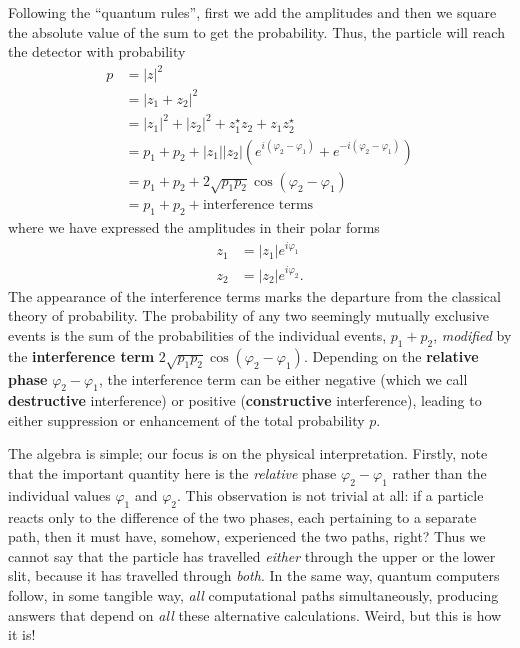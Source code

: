 \documentclass[fleqn]{article}
\begin{document}
Following the ``quantum rules'', first we add the amplitudes and then we square the absolute value of the sum to get the probability.
Thus, the particle will reach the detector with probability
\[
  \begin{aligned}
    p &= |z|^2
  \\& = |z_1 + z_2|^2
  \\& = |z_1|^2 + |z_2|^2
        + z_1^\star z_2 + z_1 z_2^\star
  \\& = p_1 + p_2
        + |z_1||z_2|\left(
          e^{i(\varphi_2-\varphi_1)}
          + e^{-i(\varphi_2-\varphi_1)}
        \right)
  \\& = p_1 + p_2
        + 2 \sqrt{p_1 p_2} \cos(\varphi_2-\varphi_1)
  \\& = p_1 + p_2 + \text{interference terms}
  \end{aligned}
\tag{1.2.1.1}
\]
where we have expressed the amplitudes in their polar forms
\[
\begin{aligned}
  z_1 &= |z_1|e^{i\varphi_1}
\\z_2 &= |z_2|e^{i\varphi_2}.
\end{aligned}
\]
The appearance of the interference terms marks the departure from the classical theory of probability.
The probability of any two seemingly mutually exclusive events is the sum of the probabilities of the individual events, \(p_1 + p_2\), \emph{modified} by the \textbf{interference term} \(2 \sqrt{p_1p_2}\cos(\varphi_2-\varphi_1)\).
Depending on the \textbf{relative phase} \(\varphi_2-\varphi_1\), the interference term can be either negative (which we call \textbf{destructive} interference) or positive (\textbf{constructive} interference), leading to either suppression or enhancement of the total probability \(p\).

The algebra is simple; our focus is on the physical interpretation.
Firstly, note that the important quantity here is the \emph{relative} phase \(\varphi_2-\varphi_1\) rather than the individual values \(\varphi_1\) and \(\varphi_2\).
This observation is not trivial at all: if a particle reacts only to the difference of the two phases, each pertaining to a separate path, then it must have, somehow, experienced the two paths, right?
Thus we cannot say that the particle has travelled \emph{either} through the upper or the lower slit, because it has travelled through \emph{both}.
In the same way, quantum computers follow, in some tangible way, \emph{all} computational paths simultaneously, producing answers that depend on \emph{all} these alternative calculations.
Weird, but this is how it is!
\end{document}
